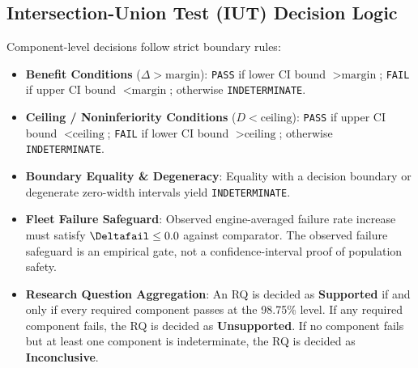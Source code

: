 \subsection*{Intersection-Union Test (IUT) Decision Logic}
Component-level decisions follow strict boundary rules:
\begin{itemize}
    \item \textbf{Benefit Conditions} ($\Delta > \text{margin}$): \texttt{PASS} if lower CI bound $> \text{margin}$; \texttt{FAIL} if upper CI bound $< \text{margin}$; otherwise \texttt{INDETERMINATE}.
    \item \textbf{Ceiling / Noninferiority Conditions} ($D < \text{ceiling}$): \texttt{PASS} if upper CI bound $< \text{ceiling}$; \texttt{FAIL} if lower CI bound $> \text{ceiling}$; otherwise \texttt{INDETERMINATE}.
    \item \textbf{Boundary Equality \& Degeneracy}: Equality with a decision boundary or degenerate zero-width intervals yield \texttt{INDETERMINATE}.
    \item \textbf{Fleet Failure Safeguard}: Observed engine-averaged failure rate increase must satisfy $\Deltafail \le 0.0$ against comparator. The observed failure safeguard is an empirical gate, not a confidence-interval proof of population safety.
    \item \textbf{Research Question Aggregation}: An RQ is decided as \textbf{Supported} if and only if every required component passes at the 98.75\% level. If any required component fails, the RQ is decided as \textbf{Unsupported}. If no component fails but at least one component is indeterminate, the RQ is decided as \textbf{Inconclusive}.
\end{itemize}
